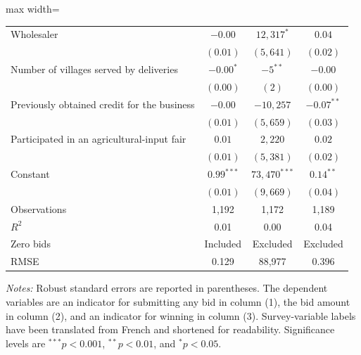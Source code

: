 \documentclass[11pt]{article}
\begin{document}
\begin{table}[!htbp]
\begin{threeparttable}
\begin{adjustbox}{max width=\textwidth}
\begin{tabular}{lccc}
Wholesaler
    & $-0.00$
    & $12{,}317^{*}$
    & $0.04$ \\
    & $(0.01)$
    & $(5{,}641)$
    & $(0.02)$ \\

Number of villages served by deliveries
    & $-0.00^{*}$
    & $-5^{**}$
    & $-0.00$ \\
    & $(0.00)$
    & $(2)$
    & $(0.00)$ \\

Previously obtained credit for the business
    & $-0.00$
    & $-10{,}257$
    & $-0.07^{**}$ \\
    & $(0.01)$
    & $(5{,}659)$
    & $(0.03)$ \\

Participated in an agricultural-input fair
    & $0.01$
    & $2{,}220$
    & $0.02$ \\
    & $(0.01)$
    & $(5{,}381)$
    & $(0.02)$ \\

\addlinespace
Constant
    & $0.99^{***}$
    & $73{,}470^{***}$
    & $0.14^{**}$ \\
    & $(0.01)$
    & $(9{,}669)$
    & $(0.04)$ \\

\midrule
Observations
    & 1,192 & 1,172 & 1,189 \\
$R^{2}$
    & 0.01 & 0.00 & 0.04 \\
Zero bids
    & Included & Excluded & Excluded \\
RMSE
    & 0.129 & 88,977 & 0.396 \\
\bottomrule
\end{tabular}
\end{adjustbox}

\begin{tablenotes}[flushleft]
\footnotesize
\item \textit{Notes:} Robust standard errors are reported in parentheses.
The dependent variables are an indicator for submitting any bid in column (1),
the bid amount in column (2), and an indicator for winning in column (3).
Survey-variable labels have been translated from French and shortened for readability.
Significance levels are $^{***}p<0.001$, $^{**}p<0.01$, and $^{*}p<0.05$.
\end{tablenotes}

\end{threeparttable}
\end{table}
\end{document}
